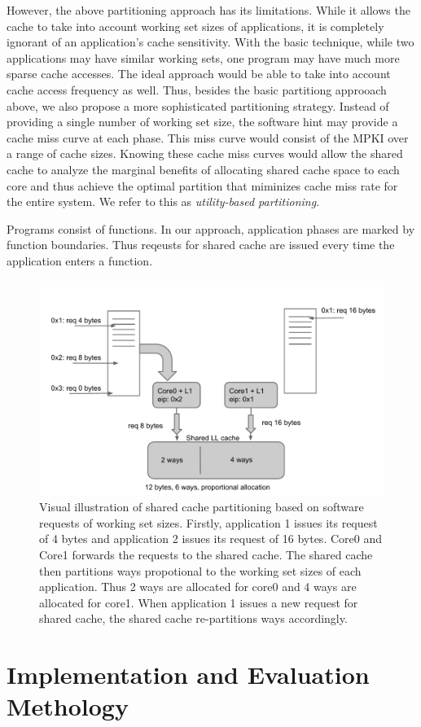 \documentclass{acm_proc_article-sp}
\begin{document}
However, the above partitioning approach has its limitations. While it allows the
cache to take into account working set sizes of applications, it is completely ignorant
of an application's cache sensitivity. With the basic technique, while two applications
may have similar working sets, one program may have much more sparse cache accesses.
The ideal approach would be able to take into account cache access frequency as well. 
Thus, besides the basic partitiong approoach above, we also propose a more 
sophisticated partitioning strategy. Instead of providing a single number of 
working set size, the software hint may provide a cache miss curve at each 
phase. This miss curve would consist of the MPKI over a range of cache sizes. 
Knowing these cache miss curves would allow the shared cache to analyze the 
marginal benefits of allocating shared cache space to each core and thus achieve
the optimal partition that miminizes cache miss rate for the entire system. We refer to this as 
\emph{utility-based partitioning}.

Programs consist of functions. In our approach, application phases are marked by
function boundaries. Thus reqeusts for shared cache are issued every time the 
application enters a function.

\begin{figure}[th!]
  \centering
  \includegraphics[width=.5\textwidth]{figs/hinted_partition.pdf}
  \caption{\small Visual illustration of shared cache partitioning based on software 
    requests of working set sizes. Firstly, application 1 issues its request 
    of 4 bytes and application 2 issues its request of 16 bytes. Core0 and Core1 
  forwards the requests to the shared cache. The shared cache then partitions 
  ways propotional to the working set sizes of each application. Thus 2 ways are 
  allocated for core0 and 4 ways are allocated for core1. When application 1 issues
  a new request for shared cache, the shared cache re-partitions ways 
  accordingly.}
  \label{fig:hinted_partition}
\end{figure}

\section{Implementation and Evaluation Methology}
\end{document}
